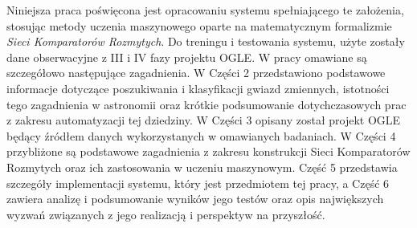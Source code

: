 \documentclass{pracalicmgr}
\begin{document}
    Niniejsza praca poświęcona jest opracowaniu systemu spełniającego te założenia, stosując metody uczenia maszynowego oparte na matematycznym formalizmie \textit{Sieci Komparatorów Rozmytych}. Do treningu i testowania systemu, użyte zostały dane obserwacyjne z III i IV fazy projektu OGLE. W pracy omawiane są szczegółowo następujące zagadnienia. W Części 2 przedstawiono podstawowe informacje dotyczące poszukiwania i klasyfikacji gwiazd zmiennych, istotności tego zagadnienia w astronomii oraz krótkie podsumowanie dotychczasowych prac z zakresu automatyzacji tej dziedziny. W Części 3 opisany został projekt OGLE będący źródłem danych wykorzystanych w omawianych badaniach. W Części 4 przybliżone są podstawowe zagadnienia z zakresu konstrukcji Sieci Komparatorów Rozmytych oraz ich zastosowania w uczeniu maszynowym. Część 5 przedstawia szczegóły implementacji systemu, który jest przedmiotem tej pracy, a Część 6 zawiera analizę i podsumowanie wyników jego testów oraz opis największych wyzwań związanych z jego realizacją i perspektyw na przyszłość.  
\end{document}
